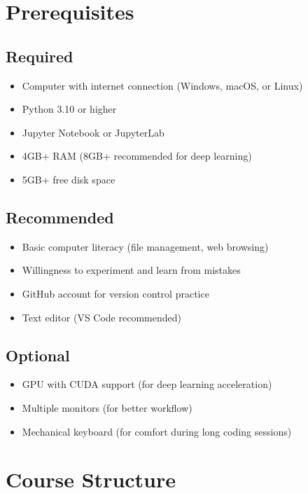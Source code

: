 \documentclass[11pt,letterpaper]{article}
\begin{document}
\section{Prerequisites}

\subsection{Required}
\begin{itemize}[leftmargin=*]
    \item Computer with internet connection (Windows, macOS, or Linux)
    \item Python 3.10 or higher
    \item Jupyter Notebook or JupyterLab
    \item 4GB+ RAM (8GB+ recommended for deep learning)
    \item 5GB+ free disk space
\end{itemize}

\subsection{Recommended}
\begin{itemize}[leftmargin=*]
    \item Basic computer literacy (file management, web browsing)
    \item Willingness to experiment and learn from mistakes
    \item GitHub account for version control practice
    \item Text editor (VS Code recommended)
\end{itemize}

\subsection{Optional}
\begin{itemize}[leftmargin=*]
    \item GPU with CUDA support (for deep learning acceleration)
    \item Multiple monitors (for better workflow)
    \item Mechanical keyboard (for comfort during long coding sessions)
\end{itemize}

\section{Course Structure}
\end{document}
